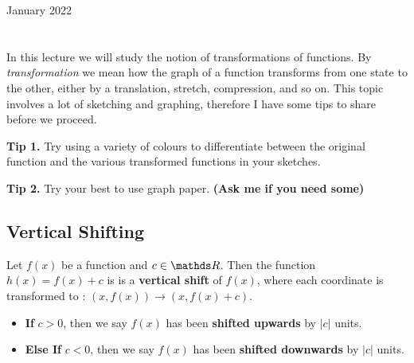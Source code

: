 \documentclass[12pt,oneside]{book} %
\begin{document}
	\renewcommand*{\term}{Term 2} %
	\renewcommand*{\coursecode}{MCR3U} %
	\renewcommand*{\coursename}{Course Name} %
	\renewcommand*{\thelecnum}{5} %
	\renewcommand*{\profname}{Prof Name} %
	\renewcommand*{\colink}{http://www.student.math.uwaterloo.ca/~c2kent} %
	\clearpage
	\pagestyle{classlecture}
\begin{lec}{January 2022}
	\chapter{\chapname\chaplec}
  In this lecture we will study the notion of transformations of functions. By \textit{transformation} we mean how
  the graph of a function transforms from one state to the other, either by a translation, stretch,
  compression, and so on. This topic involves a lot of
  sketching and graphing, therefore I have some tips to share before we proceed.


  \textbf{Tip 1.} Try using a variety of colours to differentiate
  between the original function and the various transformed functions in your sketches. 

  \textbf{Tip 2.} Try your best to use graph paper. \textbf{(Ask me if you need some)}

  \section{Vertical Shifting}
  Let $f(x)$ be a function and $c \in \R$. Then the function $h(x) = f(x) + c$ is is a \textbf{vertical shift }of $f(x)$,
  where each coordinate is transformed to : $(x,f(x)) \rightarrow \left(x, f(x) + c\right)$.
  \begin{itemize}
    \item \textbf{If } $c > 0$, then we say $f(x)$ has been \textbf{shifted upwards} by $\left|c\right|$ units.
    \item \textbf{Else If } $c < 0$, then we say $f(x)$ has been \textbf{shifted downwards} by $\left|c\right|$ units.
  \end{itemize}


\end{lec}
\end{document}
